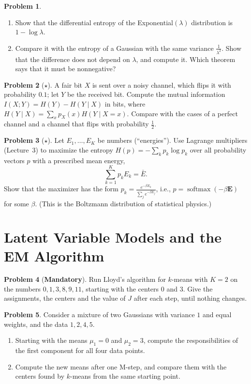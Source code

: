 \documentclass[11pt]{article}
\theoremstyle{definition}
\newtheorem{problem}{Problem}[section]
\newcommand{\mandatory}{\textcolor{red!70!black}{\textbf{Mandatory}}}
\DeclareMathOperator{\softmax}{softmax}
\begin{document}
\begin{problem}\label{pr:exp-entropy}
    \begin{enumerate}[label=(\alph*)]
        \item Show that the differential entropy of the Exponential$(\lambda)$ distribution is $1 - \log\lambda$.
        \item Compare it with the entropy of a Gaussian with the same variance $\frac{1}{\lambda^2}$. Show that the difference does not depend on $\lambda$, and compute it. Which theorem says that it must be nonnegative?
    \end{enumerate}
\end{problem}

\begin{problem}[$\star$]\label{pr:channel}
    A fair bit $X$ is sent over a noisy channel, which flips it with probability $0.1$; let $Y$ be the received bit. Compute the mutual information $I(X; Y) = H(Y) - H(Y \mid X)$ in bits, where $H(Y \mid X) = \sum_x p_X(x)H(Y \mid X = x)$. Compare with the cases of a perfect channel and a channel that flips with probability $\frac{1}{2}$.
\end{problem}

\begin{problem}[$\star$]\label{pr:max-entropy-softmax}
    Let $E_1, \ldots, E_K$ be numbers (``energies''). Use Lagrange multipliers (Lecture~3) to maximize the entropy $H(p) = -\sum_k p_k\log p_k$ over all probability vectors $p$ with a prescribed mean energy,
    \[\sum_{k=1}^K p_k E_k = \bar E.\]
    Show that the maximizer has the form $p_k = \frac{e^{-\beta E_k}}{\sum_j e^{-\beta E_j}}$, i.e., $p = \softmax(-\beta\mathbf{E})$ for some $\beta$. (This is the Boltzmann distribution of statistical physics.)
\end{problem}

\section{Latent Variable Models and the EM Algorithm}

\begin{problem}[\mandatory]\label{pr:kmeans-practice}
    Run Lloyd's algorithm for $k$-means with $K = 2$ on the numbers $0, 1, 3, 8, 9, 11$, starting with the centers $0$ and $3$. Give the assignments, the centers and the value of $J$ after each step, until nothing changes.
\end{problem}

\begin{problem}\label{pr:em-practice}
    Consider a mixture of two Gaussians with variance $1$ and equal weights, and the data $1, 2, 4, 5$.
    \begin{enumerate}[label=(\alph*)]
        \item Starting with the means $\mu_1 = 0$ and $\mu_2 = 3$, compute the responsibilities of the first component for all four data points.
        \item Compute the new means after one M-step, and compare them with the centers found by $k$-means from the same starting point.
    \end{enumerate}
\end{problem}
\end{document}
